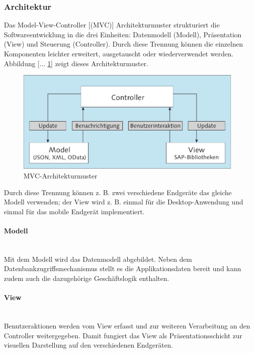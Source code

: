 \subsubsection{Architektur}
\glqq Das Model-View-Controller [(MVC)] Architekturmuster strukturiert die Softwareentwicklung in die drei Einheiten: Datenmodell (Modell), Präsentation (View) und Steuerung (Controller). Durch diese Trennung können die einzelnen Komponenten leichter erweitert, ausgetauscht oder wiederverwendet werden. Abbildung [... \ref{fig:mvcarch}] zeigt dieses Architekturmuster.
	
\vspace{1em}
\begin{figure}[htb]
  \centering
  \includegraphics[width=0.75\linewidth]{abb/mvc_arch2}
  \caption[MVC-Architekturmuster]{MVC-Architekturmuster \cite[S.124]{AntoEinf2014}}
  \label{fig:mvcarch}
\end{figure}

Durch diese Trennung können z. B. zwei verschiedene Endgeräte das gleiche Modell verwenden; der View wird z. B. einmal für die Desktop-Anwendung und einmal für das mobile Endgerät implementiert.\grqq{}\cite[S.123]{AntoEinf2014}

\paragraph{Modell}$\;$ \\
Mit dem Modell wird das Datenmodell abgebildet. Neben dem Datenbankzugriffsmechanismus stellt es die Applikationsdaten bereit und kann zudem auch die dazugehörige Geschäftslogik enthalten.

\paragraph{View}$\;$ \\
Benutzeraktionen werden vom View erfasst und zur weiteren Verarbeitung an den Controller weitergegeben. Damit fungiert das View als Präsentationsschicht zur visuellen Darstellung auf den verschiedenen Endgeräten.


